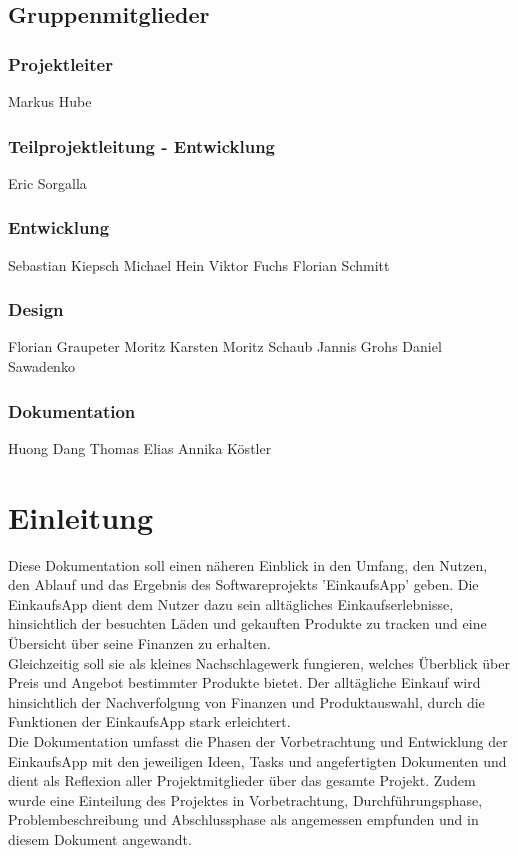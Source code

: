 \documentclass[12pt,a4paper]{article}
\begin{document}
\subsection*{Gruppenmitglieder}
\subsubsection*{Projektleiter}
Markus Hube
\subsubsection*{Teilprojektleitung - Entwicklung}
Eric Sorgalla
\subsubsection*{Entwicklung}
Sebastian Kiepsch
\newline
Michael Hein
\newline
Viktor Fuchs
\newline
Florian Schmitt 
\subsubsection*{Design}
Florian Graupeter
\newline
Moritz Karsten
\newline
Moritz Schaub
\newline
Jannis Grohs
\newline
Daniel Sawadenko 
\subsubsection*{Dokumentation}
Huong Dang
\newline
Thomas Elias
\newline
Annika Köstler
\newpage


\section*{Einleitung}
Diese Dokumentation soll einen näheren Einblick in den Umfang, den Nutzen, den Ablauf und das Ergebnis des Softwareprojekts 'EinkaufsApp' geben.  
Die EinkaufsApp dient dem Nutzer dazu sein alltägliches Einkaufserlebnisse, hinsichtlich der besuchten Läden und gekauften Produkte zu tracken und eine Übersicht über seine Finanzen zu erhalten.
\\
Gleichzeitig soll sie als kleines Nachschlagewerk fungieren, welches Überblick über Preis und Angebot bestimmter Produkte bietet.
Der alltägliche Einkauf wird hinsichtlich der Nachverfolgung von Finanzen und Produktauswahl, durch die Funktionen der EinkaufsApp stark erleichtert.
\\
Die Dokumentation umfasst die Phasen der Vorbetrachtung und Entwicklung der EinkaufsApp mit den jeweiligen Ideen, Tasks und angefertigten Dokumenten und dient als Reflexion aller Projektmitglieder über das gesamte Projekt.
Zudem wurde eine Einteilung des Projektes in Vorbetrachtung, Durchführungsphase, Problembeschreibung und Abschlussphase als angemessen empfunden und in diesem Dokument angewandt.
\newpage
\end{document}

